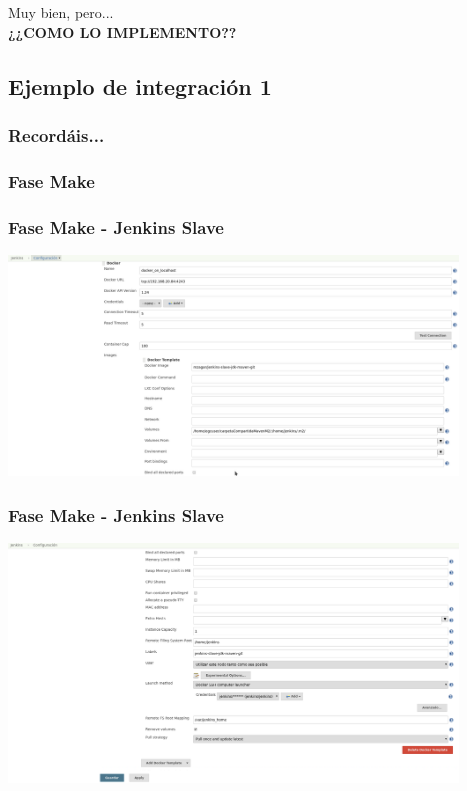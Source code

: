 \documentclass[
xcolor={svgnames},
hyperref={colorlinks,citecolor=DeepPink4,linkcolor=Black,urlcolor=DarkBlue}
]{beamer}
\begin{document}
\begin{frame}
	\begin{center}
		Muy bien, pero... \\
	\textbf{¿¿COMO LO IMPLEMENTO??}
	\end{center}
\end{frame}

\subsection{Ejemplo de integración 1}

\begin{frame}
	\frametitle{Recordáis...}
\end{frame}

\subsubsection{Fase Make}

\begin{frame}
	\frametitle{Fase Make - Jenkins Slave}
	\begin{center}
		\includegraphics[width=4.7in]{images/jenkins/docker_slave_a/jenkins_dockerSlaveA_1.png}
	\end{center}
\end{frame}

\begin{frame}
	\frametitle{Fase Make - Jenkins Slave}
	\begin{center}
		\includegraphics[width=4.7in]{images/jenkins/docker_slave_a/jenkins_dockerSlaveA_2.png}
	\end{center}
\end{frame}
\end{document}
